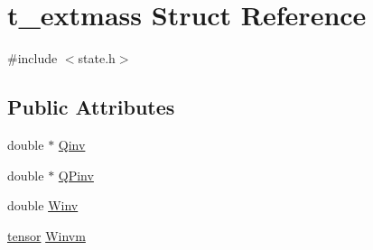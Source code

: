\hypertarget{structt__extmass}{\section{t\-\_\-extmass \-Struct \-Reference}
\label{structt__extmass}
}


{\ttfamily \#include $<$state.\-h$>$}

\subsection*{\-Public \-Attributes}
\begin{DoxyCompactItemize}
\item 
double $\ast$ \hyperlink{structt__extmass_a4eb2f250e880e774e8fa0a29b0cf55cc}{\-Qinv}
\item 
double $\ast$ \hyperlink{structt__extmass_a8e85d6b0cd63ea4ec8b5b58ad70f9eb1}{\-Q\-Pinv}
\item 
double \hyperlink{structt__extmass_abe556375259538b303361abaa4b4b200}{\-Winv}
\item 
\hyperlink{share_2template_2gromacs_2types_2simple_8h_aef0bf341f56ce75f09dbb64350488a61}{tensor} \hyperlink{structt__extmass_a9c70bdc08e98387490f2813fd98abb11}{\-Winvm}
\end{DoxyCompactItemize}


